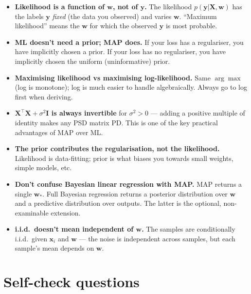 \documentclass[11pt, a4paper]{article}
\begin{document}
\begin{itemize}
  \item \textbf{Likelihood is a function of $\mathbf{w}$, not of $\mathbf{y}$.} The likelihood $p(\mathbf{y}|\mathbf{X},\mathbf{w})$ has the labels $\mathbf{y}$ \emph{fixed} (the data you observed) and varies $\mathbf{w}$. ``Maximum likelihood'' means the $\mathbf{w}$ for which the observed $\mathbf{y}$ is most probable.
  \item \textbf{ML doesn't need a prior; MAP does.} If your loss has a regulariser, you have implicitly chosen a prior. If your loss has no regulariser, you have implicitly chosen the uniform (uninformative) prior.
  \item \textbf{Maximising likelihood vs maximising log-likelihood.} Same $\arg\max$ (log is monotone); log is much easier to handle algebraically. Always go to log first when deriving.
  \item \textbf{$\mathbf{X}^\top\mathbf{X} + \sigma^2\mathbf{I}$ is always invertible} for $\sigma^2 > 0$ — adding a positive multiple of identity makes any PSD matrix PD. This is one of the key practical advantages of MAP over ML.
  \item \textbf{The prior contributes the regularisation, not the likelihood.} Likelihood is data-fitting; prior is what biases you towards small weights, simple models, etc.
  \item \textbf{Don't confuse Bayesian linear regression with MAP.} MAP returns a single $\mathbf{w}_*$. Full Bayesian regression returns a posterior distribution over $\mathbf{w}$ and a predictive distribution over outputs. The latter is the optional, non-examinable extension.
  \item \textbf{i.i.d.\ doesn't mean independent of $\mathbf{w}$.} The samples are conditionally i.i.d.\ given $\mathbf{x}_i$ and $\mathbf{w}$ — the noise is independent across samples, but each sample's mean depends on $\mathbf{w}$.
\end{itemize}

\section*{Self-check questions}
\end{document}
